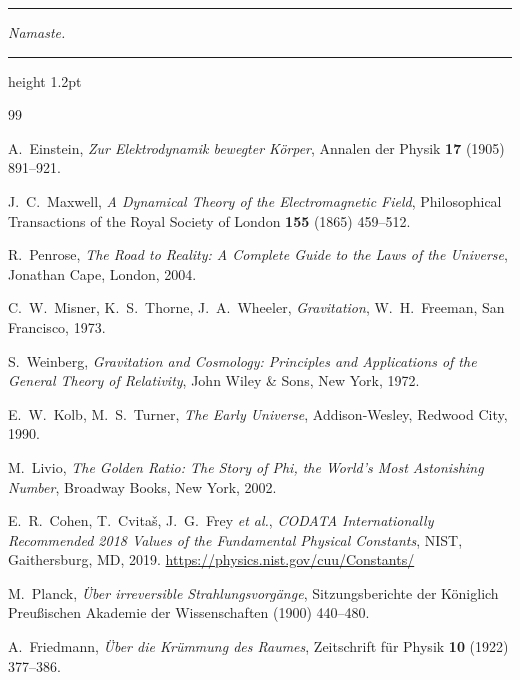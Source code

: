 \documentclass[11pt,a4paper]{article}
\begin{document}
\vspace{18pt}
{\color{ruleblue}\hrule}
\vspace{10pt}
\begin{center}
  \textit{\color{midblue}Namaste.}
\end{center}

\vspace{20pt}
{\color{midblue}\hrule height 1.2pt}
\vspace{12pt}

\begin{thebibliography}{99}
\small

A.~Einstein,
\textit{Zur Elektrodynamik bewegter K\"orper},
Annalen der Physik \textbf{17} (1905) 891--921.

J.~C.~Maxwell,
\textit{A Dynamical Theory of the Electromagnetic Field},
Philosophical Transactions of the Royal Society of London
\textbf{155} (1865) 459--512.

R.~Penrose,
\textit{The Road to Reality: A Complete Guide to the Laws of the Universe},
Jonathan Cape, London, 2004.

C.~W.~Misner, K.~S.~Thorne, J.~A.~Wheeler,
\textit{Gravitation},
W.~H.~Freeman, San Francisco, 1973.

S.~Weinberg,
\textit{Gravitation and Cosmology: Principles and Applications
  of the General Theory of Relativity},
John Wiley \& Sons, New York, 1972.

E.~W.~Kolb, M.~S.~Turner,
\textit{The Early Universe},
Addison-Wesley, Redwood City, 1990.

M.~Livio,
\textit{The Golden Ratio: The Story of Phi, the World's Most Astonishing Number},
Broadway Books, New York, 2002.

E.~R.~Cohen, T.~Cvita\v{s}, J.~G.~Frey \textit{et al.},
\textit{CODATA Internationally Recommended 2018 Values
  of the Fundamental Physical Constants},
NIST, Gaithersburg, MD, 2019.
\url{https://physics.nist.gov/cuu/Constants/}

M.~Planck,
\textit{\"Uber irreversible Strahlungsvorg\"ange},
Sitzungsberichte der K\"oniglich Preu\ss{}ischen Akademie der Wissenschaften
(1900) 440--480.

A.~Friedmann,
\textit{\"Uber die Kr\"ummung des Raumes},
Zeitschrift f\"ur Physik \textbf{10} (1922) 377--386.

\end{thebibliography}
\end{document}
